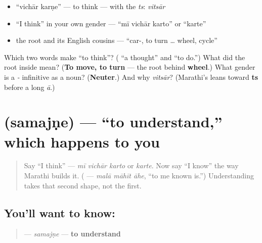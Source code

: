 \begin{itemize}
\raggedright
  \item \textquotedblleft{}vichār karṇe\textquotedblright{} — to think — with the \emph{ts}: \emph{vitsār}
  \item \textquotedblleft{}I think\textquotedblright{} in your own gender — \textquotedblleft{}mī vichār karto\textquotedblright{} or \textquotedblleft{}karte\textquotedblright{}
  \item the root and its English cousins — \textquotedblleft{}car-, to turn … wheel, cycle\textquotedblright{}
\end{itemize}

\begin{tcolorbox}[breakable,colback=teal!4,colframe=teal!35!black,title={Before you move on}]
Which two words make \textquotedblleft{}to think\textquotedblright{}? (\textbf{} \textquotedblleft{}a thought\textquotedblright{} and \textbf{} \textquotedblleft{}to do.\textquotedblright{}) What did the root inside \textbf{} mean? (\textbf{To move, to turn} — the root behind \textbf{wheel}.) What gender is a \emph{-} infinitive as a noun? (\textbf{Neuter}.) And why \emph{vitsār}? (Marathi's \textbf{} leans toward \textbf{ts} before a long \emph{ā}.)
\end{tcolorbox}
\section[samajṇe]{ (samajṇe) — \textquotedblleft{}to understand,\textquotedblright{} which happens to you}

\label{lesson:MR-C08-samajne}



\begin{quote}
Say \textquotedblleft{}I think\textquotedblright{} — \emph{mī vichār karto} or \emph{karte}. Now say \textquotedblleft{}I know\textquotedblright{} the way Marathi builds it. (\textbf{  } — \emph{malā māhīt āhe}, \textquotedblleft{}to me known is.\textquotedblright{}) Understanding takes that second shape, not the first.
\end{quote}

\subsection*{You'll want to know: }
\begin{quote}
\textbf{} — \emph{samajṇe} — \textbf{to understand}
\end{quote}

